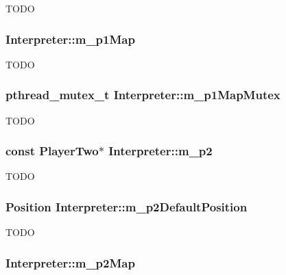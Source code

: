 \label{classInterpreter_a681f0273945917ab4dabec7b400bf001}
TODO \hypertarget{classInterpreter_a4c923fac8d283ef70a03812fce74ef47}{
\subsubsection[{m\_\-p1Map}]{ {\bf Interpreter::m\_\-p1Map}}}
\label{classInterpreter_a4c923fac8d283ef70a03812fce74ef47}
TODO \hypertarget{classInterpreter_a849d1195573a32632ae33cd7ecd4bec7}{
\subsubsection[{m\_\-p1MapMutex}]{\setlength{\rightskip}{0pt plus 5cm}pthread\_\-mutex\_\-t {\bf Interpreter::m\_\-p1MapMutex}}}
\label{classInterpreter_a849d1195573a32632ae33cd7ecd4bec7}
TODO \hypertarget{classInterpreter_aefbda2bf4d390731938a93ff3e2bfaa6}{
\subsubsection[{m\_\-p2}]{\setlength{\rightskip}{0pt plus 5cm}const {\bf PlayerTwo}$\ast$ {\bf Interpreter::m\_\-p2}}}
\label{classInterpreter_aefbda2bf4d390731938a93ff3e2bfaa6}
TODO \hypertarget{classInterpreter_a2eb14ab69e51a5bdd6e393ed86b2d687}{
\subsubsection[{m\_\-p2DefaultPosition}]{\setlength{\rightskip}{0pt plus 5cm}Position {\bf Interpreter::m\_\-p2DefaultPosition}}}
\label{classInterpreter_a2eb14ab69e51a5bdd6e393ed86b2d687}
TODO \hypertarget{classInterpreter_a9704ad86fdf8eddecfe191d8540fb4ef}{
\subsubsection[{m\_\-p2Map}]{ {\bf Interpreter::m\_\-p2Map}}}
